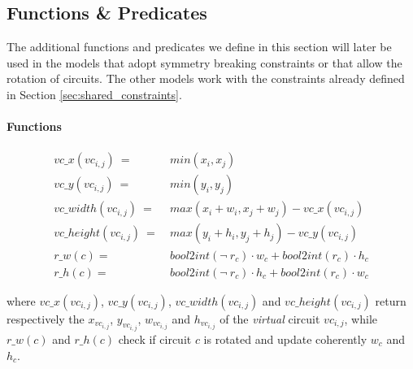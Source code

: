 
\subsection{Functions \& Predicates} \label{sec:CP_functions_predicates}
The additional functions and predicates we define in this section will later be used in the models
that adopt symmetry breaking constraints or that allow the rotation of circuits. The other models
work with the constraints already defined in Section \ref{sec:shared_constraints}.

\paragraph{Functions}
\begin{align}
  vc\_x(vc_{i,j})\        =\  & min(x_i, x_j)                                                     \nonumber \\
  vc\_y(vc_{i,j})\        =\  & min(y_i, y_j)                                                     \nonumber \\
  vc\_width(vc_{i,j})\    =\  & max(x_i + w_i, x_j + w_j) - vc\_x(vc_{i,j})                       \nonumber \\
  vc\_height(vc_{i,j})\   =\  & max(y_i + h_i, y_j + h_j) - vc\_y(vc_{i,j})                       \nonumber \\
  r\_w(c) =\                  & bool2int(\neg\ r_c) \cdot w_c + bool2int(r_c) \cdot h_c
  \label{eq:CP_r_w}                                                                                         \\
  r\_h(c) =\                  & bool2int(\neg\ r_c) \cdot h_c + bool2int(r_c) \cdot w_c
  \label{eq:CP_r_h}
\end{align}

where $vc\_x(vc_{i,j})$, $vc\_y(vc_{i,j})$, $vc\_width(vc_{i,j})$ and $vc\_height(vc_{i,j})$
return respectively the $x_{vc_{i,j}}$, $y_{vc_{i,j}}$, $w_{vc_{i,j}}$ and $h_{vc_{i,j}}$ of
the \textit{virtual} circuit $vc_{i,j}$, while $r\_w(c)$ and $r\_h(c)$ check if circuit $c$
is rotated and update coherently $w_c$ and $h_c$.

